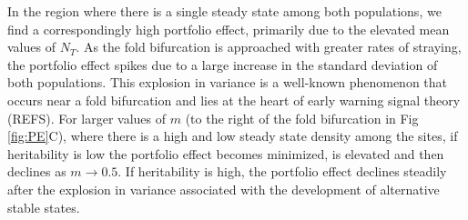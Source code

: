 \documentclass[twocolumn,preprintnumbers,amsmath,amssymb,superscriptaddress]{revtex4}
\begin{document}
In the region where there is a single steady state among both populations, we find a correspondingly high portfolio effect, primarily due to the elevated mean values of $N_T$.
As the fold bifurcation is approached with greater rates of straying, the portfolio effect spikes due to a large increase in the standard deviation of both populations.
This explosion in variance is a well-known phenomenon that occurs near a fold bifurcation and lies at the heart of early warning signal theory (REFS).
For larger values of $m$ (to the right of the fold bifurcation in Fig \ref{fig:PE}C), where there is a high and low steady state density among the sites, if heritability is low the portfolio effect becomes minimized, is elevated and then declines as $m\rightarrow 0.5$.
If heritability is high, the portfolio effect declines steadily after the explosion in variance associated with the development of alternative stable states.

\end{document}
